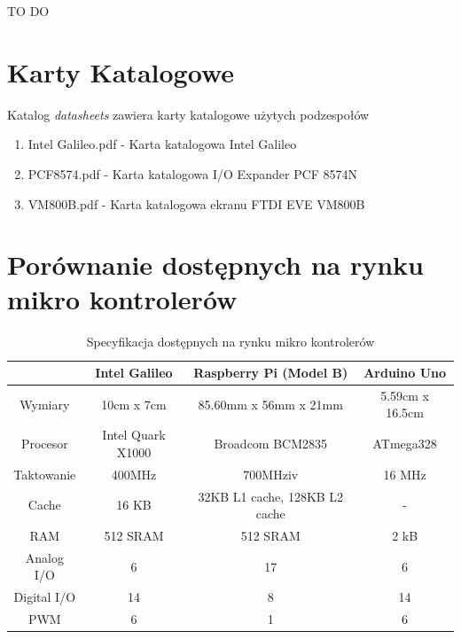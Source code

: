 \documentclass{xmgr}
\begin{document}
\summary
TO DO

\appendix
\chapter{Karty Katalogowe}
Katalog \emph{datasheets} zawiera karty katalogowe użytych podzespołów
\begin{enumerate} 
\item Intel Galileo.pdf - Karta katalogowa Intel Galileo
\item PCF8574.pdf - Karta katalogowa I/O Expander PCF 8574N
\item VM800B.pdf - Karta katalogowa ekranu FTDI EVE VM800B
\end{enumerate}
\chapter{Porównanie dostępnych na rynku mikro kontrolerów}
\begin{table}[!tbh]
\begin{tabular}{|c|c|c|c|} \hline
 & \textbf{Intel Galileo} & \textbf{Raspberry Pi (Model B)} & \textbf{Arduino Uno} \\ \hline
Wymiary & 10cm x 7cm & 85.60mm x 56mm x 21mm & 5.59cm x 16.5cm \\ \hline
Procesor & Intel Quark X1000 & Broadcom BCM2835 & ATmega328 \\ \hline
Taktowanie & 400MHz	& 700MHziv & 16 MHz\\ \hline
Cache & 16 KB & 32KB L1 cache, 128KB L2 cache & - \\ \hline
RAM & 512 SRAM & 512 SRAM & 2 kB \\ \hline
Analog I/O	& 6 & 17 & 6 \\ \hline
Digital I/O	& 14 & 8 & 14 \\ \hline
PWM	& 6 & 1 & 6 \\ \hline
\end{tabular}
\caption{Specyfikacja dostępnych na rynku mikro kontrolerów}
\end{table}
\end{document}
